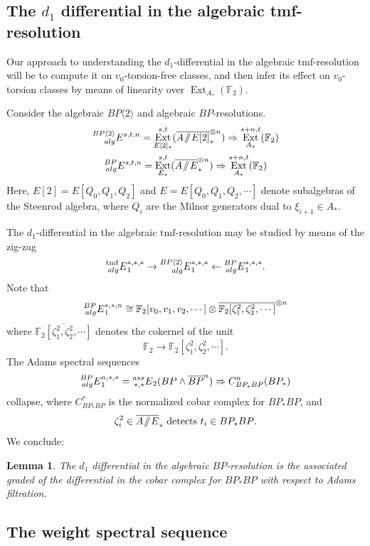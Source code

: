 \documentclass[10pt]{amsart}
\newcommand{\sslash}{\mathbin{/\mkern-6mu/}}
\newcommand{\mmod}{\! \sslash \!}
\newcommand{\bra}[1]{\langle #1 \rangle}
\newcommand{\br}[1]{\overline{#1}}
\newcommand{\FF}{\mathbb{F}}
\newcommand{\tmf}{\mathrm{tmf}}
\newtheorem{lem}[equation]{Lemma}
\theoremstyle{definition}
\numberwithin{equation}{section}
\numberwithin{figure}{section}
\DeclareMathOperator{\Ext}{Ext}
\newcommand{\xib}{\zeta}
\newcommand{\E}[2]{\prescript{#1}{#2}{E}}
\begin{document}
\subsection*{The $d_1$ differential in the algebraic tmf-resolution}

Our approach to understanding the $d_1$-differential in the algebraic $\tmf$-resolution will be to compute it on $v_0$-torsion-free classes, and then infer its effect on $v_0$-torsion classes by means of linearity over $\Ext_{A_*}(\FF_2).$

Consider the algebraic $BP\bra{2}$ and algebraic $BP$-resolutions.  
\begin{gather*}
\E{BP\bra{2}}{alg}^{s,t,n} = \Ext^{s,t}_{E[2]_*}(\br{A\mmod E[2]}_*^{\otimes n}) \Rightarrow \Ext^{s+n,t}_{A_*}(\FF_2) \\
\E{BP}{alg}^{s,t,n} = \Ext^{s,t}_{E_*}(\br{A\mmod E}_*^{\otimes n}) \Rightarrow \Ext^{s+n,t}_{A_*}(\FF_2)
\end{gather*}
Here, $E[2] = E[Q_0, Q_1, Q_2]$ and $E = E[Q_0, Q_1, Q_2, \cdots]$ denote subalgebras of the Steenrod algebra, where $Q_i$ are the Milnor generators dual to $\xi_{i+1} \in A_*$.

The $d_1$-differential in the algebraic $\tmf$-resolution may be studied by means of the zig-zag
\begin{equation}\label{eq:zigzag}
\E{\tmf}{alg}_1^{*,*,*} \rightarrow \E{BP\bra{2}}{alg}_1^{*,*,*} \leftarrow 
\E{BP}{alg}_1^{*,*,*}.
\end{equation}
Note that 
$$ \E{BP}{alg}_1^{*,*,n} \cong \FF_2[v_0, v_1, v_2, \cdots ]\otimes \br{\FF_2[\xib_1^2, \xib^2_2, \cdots]}^{\otimes n} $$
where 
$\br{\FF_2[\xib_1^2, \xib_2^2, \cdots ]}$ denotes the cokernel of the unit
$$ \FF_2 \rightarrow \FF_2[\xib_1^2, \xib_2^2, \cdots ]. $$
The Adams spectral sequences
$$ \E{BP}{alg}_1^{n,*,*} = \E{ass}{*,*}_2(BP \wedge \br{BP}^{n}) \Rightarrow C^n_{BP_*BP}(BP_*) $$
collapse, where $C^*_{BP_*BP}$ is the normalized cobar complex for $BP_*BP$, and 
$$ \text{$\xib_i^2 \in \br{A\mmod E}_*$ detects $t_i \in BP_*BP$.} $$ 
We conclude:

\begin{lem}
The $d_1$ differential in the algebraic $BP$-resolution is the associated graded of the differential in the cobar complex for $BP_*BP$ with respect to Adams filtration.
\end{lem}

\subsection*{The weight spectral sequence}
\end{document}
